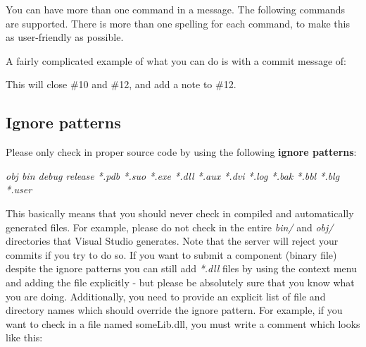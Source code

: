 You can have more than one command in a message. The following commands are supported. There is more than one spelling for each command, to make this as user-friendly as possible.

\begin{center}
\end{center}

A fairly complicated example of what you can do is with a commit message of:

\begin{center}
\end{center}

This will close \#10 and \#12, and add a note to \#12.

\subsection*{Ignore patterns}
\label{IgnorePatterns}

Please only check in proper source code by using the following \textbf{ignore patterns}:

\begin{center}
\textit{obj bin debug release *.pdb *.suo *.exe *.dll *.aux *.dvi *.log *.bak *.bbl *.blg *.user}
\end{center}

This basically means that you should never check in compiled and automatically generated files. For example, please do not check in the entire \textit{bin/} and \textit{obj/} directories that Visual Studio generates. Note that the server will reject your commits if you try to do so. If you want to submit a component (binary file) despite the ignore patterns you can still add \textit{*.dll} files by using the context menu and adding the file explicitly - but please be absolutely sure that you know what you are doing. Additionally, you need to provide an explicit list of file and directory names which should override the ignore pattern. For example, if you want to check in a file named someLib.dll, you must write a comment which looks like this:

